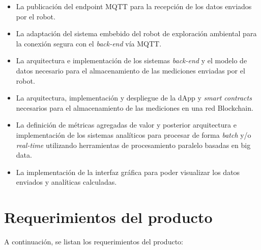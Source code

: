 \begin{itemize}
	\item La publicación del endpoint MQTT \cite{mqtt_spec} para la recepción de los datos enviados por el robot.
	\item La adaptación del sistema embebido del robot de exploración ambiental para la conexión segura con el \textit{back-end} vía MQTT.
	\item La arquitectura e implementación de los sistemas \textit{back-end} y el modelo de datos necesario para el almacenamiento de las mediciones enviadas por el robot.
	\item La arquitectura, implementación y despliegue de la dApp y \textit{smart contracts} necesarios para el almacenamiento de las mediciones en una red Blockchain.
	\item La definición de métricas agregadas de valor y posterior arquitectura e implementación de los sistemas analíticos para procesar de forma \textit{batch} y/o \textit{real-time} utilizando herramientas de procesamiento paralelo basadas en big data.
	\item La implementación de la interfaz gráfica para poder visualizar los datos enviados y analíticas calculadas.

\end{itemize}




\section{Requerimientos del producto}


A continuación, se listan los requerimientos del producto:

